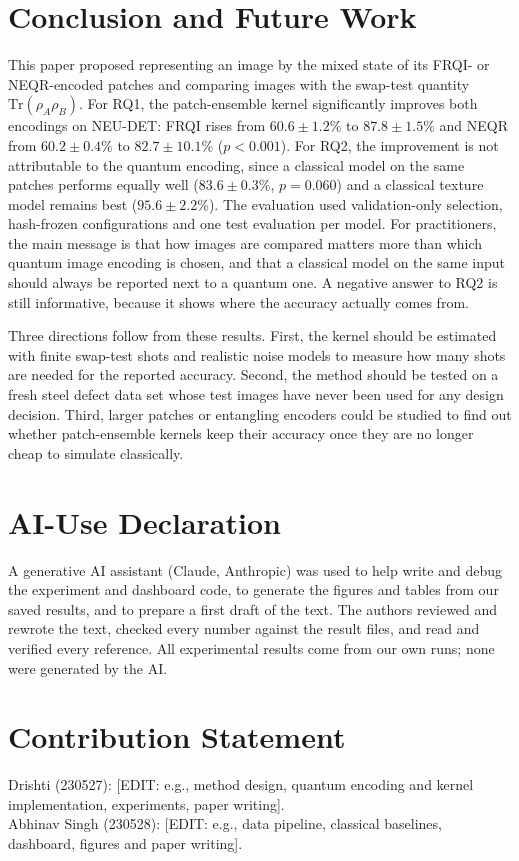 \documentclass[12pt,onecolumn,draftclsnofoot]{IEEEtran}
\begin{document}
\section{Conclusion and Future Work}
This paper proposed representing an image by the mixed state of its FRQI- or NEQR-encoded patches and comparing images with the swap-test quantity $\mathrm{Tr}(\rho_A\rho_B)$. For RQ1, the patch-ensemble kernel significantly improves both encodings on NEU-DET: FRQI rises from $60.6\pm1.2\%$ to $87.8\pm1.5\%$ and NEQR from $60.2\pm0.4\%$ to $82.7\pm10.1\%$ ($p<0.001$). For RQ2, the improvement is not attributable to the quantum encoding, since a classical model on the same patches performs equally well ($83.6\pm0.3\%$, $p=0.060$) and a classical texture model remains best ($95.6\pm2.2\%$). The evaluation used validation-only selection, hash-frozen configurations and one test evaluation per model. For practitioners, the main message is that how images are compared matters more than which quantum image encoding is chosen, and that a classical model on the same input should always be reported next to a quantum one. A negative answer to RQ2 is still informative, because it shows where the accuracy actually comes from.

Three directions follow from these results. First, the kernel should be estimated with finite swap-test shots and realistic noise models to measure how many shots are needed for the reported accuracy. Second, the method should be tested on a fresh steel defect data set whose test images have never been used for any design decision. Third, larger patches or entangling encoders could be studied to find out whether patch-ensemble kernels keep their accuracy once they are no longer cheap to simulate classically.

\section*{AI-Use Declaration}
A generative AI assistant (Claude, Anthropic) was used to help write and debug the experiment and dashboard code, to generate the figures and tables from our saved results, and to prepare a first draft of the text. The authors reviewed and rewrote the text, checked every number against the result files, and read and verified every reference. All experimental results come from our own runs; none were generated by the AI.

\section*{Contribution Statement}
\noindent Drishti (230527): [EDIT: e.g., method design, quantum encoding and kernel implementation, experiments, paper writing].\\
Abhinav Singh (230528): [EDIT: e.g., data pipeline, classical baselines, dashboard, figures and paper writing].



\end{document}
